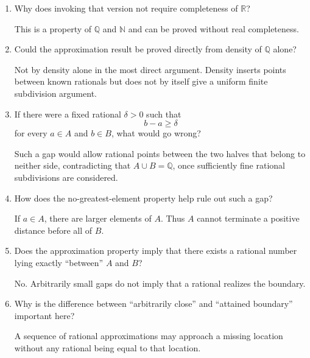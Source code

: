 \documentclass{self-check}
\begin{document}
\begin{enumerate}[label=\arabic*., itemsep=10pt]
\begin{answer}
It suffices that for every positive rational $\varepsilon$ and positive rational $M$, there exists $n\in\mathbb{N}$ with
\[
M/n<\varepsilon.
\]
\end{answer}

\item Why does invoking that version not require completeness of $\mathbb{R}$?

\begin{answer}
This is a property of $\mathbb{Q}$ and $\mathbb{N}$ and can be proved without real completeness.
\end{answer}

\item Could the approximation result be proved directly from density of $\mathbb{Q}$ alone?

\begin{answer}
Not by density alone in the most direct argument. Density inserts points between known rationals but does not by itself give a uniform finite subdivision argument.
\end{answer}

\item If there were a fixed rational $\delta>0$ such that
\[
b-a\ge\delta
\]
for every $a\in A$ and $b\in B$, what would go wrong?

\begin{answer}
Such a gap would allow rational points between the two halves that belong to neither side, contradicting that $A\cup B=\mathbb{Q}$, once sufficiently fine rational subdivisions are considered.
\end{answer}

\item How does the no-greatest-element property help rule out such a gap?

\begin{answer}
If $a\in A$, there are larger elements of $A$. Thus $A$ cannot terminate a positive distance before all of $B$.
\end{answer}

\item Does the approximation property imply that there exists a rational number lying exactly ``between'' $A$ and $B$?

\begin{answer}
No. Arbitrarily small gaps do not imply that a rational realizes the boundary.
\end{answer}

\item Why is the difference between ``arbitrarily close'' and ``attained boundary'' important here?

\begin{answer}
A sequence of rational approximations may approach a missing location without any rational being equal to that location.
\end{answer}

\end{enumerate}
\end{document}

